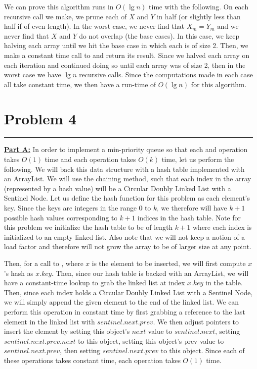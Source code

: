 \documentclass[11pt]{article}
\def\separateline{\medskip\hrule\medskip}
\begin{document}
We can prove this algorithm runs in $O(\lg{n})$ time with the following. On each recursive call we make, we prune each of $X$ and $Y$ in half (or slightly less than half if of even length). In the worst case, we never find that $X_m = Y_m$ and we never find that $X$ and $Y$ do not overlap (the base cases). In this case, we keep halving each array until we hit the base case in which each is of size 2. Then, we make a constant time call to  and return its result. Since we halved each array on each iteration and continued doing so until each array was of size 2, then in the worst case we have $\lg{n}$ recursive calls. Since the computations made in each case all take constant time, we then have a run-time of $O(\lg{n})$ for this algorithm.

\newpage

\section{Problem 4}
\separateline

\textbf{\underline{Part A:}} In order to implement a min-priority queue so that each  and  operation takes $O(1)$ time and each  operation takes $O(k)$ time, let us perform the following. We will back this data structure with a hash table implemented with an ArrayList. We will use the chaining method, such that each index in the array (represented by a hash value) will be a Circular Doubly Linked List with a Sentinel Node. Let us define the hash function for this problem as each element's key. Since the keys are integers in the range 0 to $k$, we therefore will have $k+1$ possible hash values corresponding to $k+1$ indices in the hash table. Note for this problem we initialize the hash table to be of length $k+1$ where each index is initialized to an empty linked list. Also note that we will not keep a notion of a load factor and therefore will not grow the array to be of larger size at any point.

Then, for a call to , where $x$ is the element to be inserted, we will first compute $x$'s hash as $x.key$. Then, since our hash table is backed with an ArrayList, we will have a constant-time lookup to grab the linked list at index $x.key$ in the table. Then, since each index holds a Circular Doubly Linked List with a Sentinel Node, we will simply append the given element to the end of the linked list. We can perform this operation in constant time by first grabbing a reference to the last element in the linked list with $sentinel.next.prev$. We then adjust pointers to insert the element by setting this object's $next$ value to $sentinel.next$, setting $sentinel.next.prev.next$ to this object, setting this object's prev value to $sentinel.next.prev$, then setting $sentinel.next.prev$ to this object. Since each of these operations takes constant time, each  operation takes $O(1)$ time.
\end{document}
